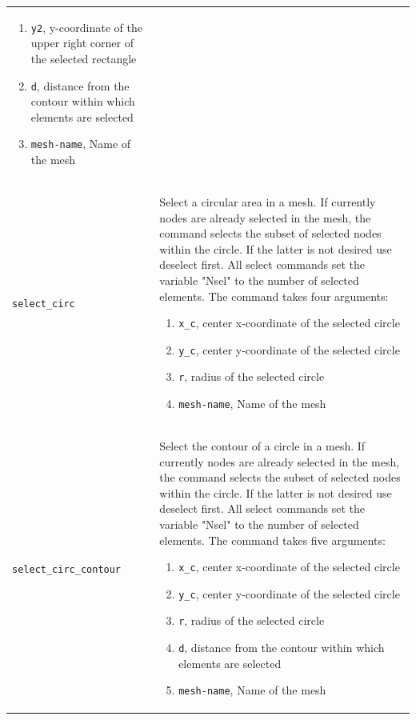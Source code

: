 \documentclass[noshowpacs,preprintnumbers,amsmath,amssymb, letter]{revtex4}
\begin{document}
\begin{longtable}{p{}p{}}
\begin{enumerate}
\item \texttt{y2}, y-coordinate of the upper right corner of the selected rectangle
\item \texttt{d}, distance from the contour within which elements are selected
\item \texttt{mesh-name}, Name of the mesh
\end{enumerate}\\
\texttt{select\_circ}	& Select a circular area in a mesh. If currently nodes are already selected in the mesh, the command selects the subset of selected nodes within the circle. If the latter is not desired use deselect first. All select commands set the variable "Nsel" to the number of selected elements. The command takes four arguments:
\begin{enumerate}
\item \texttt{x\_c}, center x-coordinate of the selected circle
\item \texttt{y\_c}, center y-coordinate of the selected circle
\item \texttt{r}, radius of the selected circle
\item \texttt{mesh-name}, Name of the mesh
\end{enumerate}\\
\texttt{select\_circ\_contour}	& Select the contour of a circle in a mesh. If currently nodes are already selected in the mesh, the command selects the subset of selected nodes within the circle. If the latter is not desired use deselect first. All select commands set the variable "Nsel" to the number of selected elements. The command takes five arguments:
\begin{enumerate}
\item \texttt{x\_c}, center x-coordinate of the selected circle
\item \texttt{y\_c}, center y-coordinate of the selected circle
\item \texttt{r}, radius of the selected circle
\item \texttt{d}, distance from the contour within which elements are selected
\item \texttt{mesh-name}, Name of the mesh
\end{enumerate}\\

\end{longtable}
\end{document}
